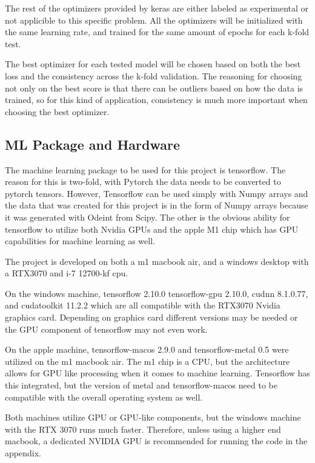 \documentclass[12pt]{article}
\begin{document}
	The rest of the optimizers provided by keras are either labeled as experimental or not applicible to this specific problem. All the optimizers will be initialized with the same learning rate, and trained for the same amount of epochs for each k-fold test.

	The best optimizer for each tested model will be chosen based on both the best loss and the consistency across the k-fold validation. The reasoning for choosing not only on the best score is that there can be outliers based on how the data is trained, so for this kind of application, consistency is much more important when choosing the best optimizer.

	\subsection*{ML Package and Hardware}

	The machine learning package to be used for this project is tensorflow. The reason for this is two-fold, with Pytorch the data needs to be converted to pytorch tensors. However, Tensorflow can be used simply with Numpy arrays and the data that was created for this project is in the form of Numpy arrays because it was generated with Odeint from Scipy. The other is the obvious ability for tensorflow to utilize both Nvidia GPUs and the apple M1 chip which has GPU capabilities for machine learning as well.

	The project is developed on both a m1 macbook air, and a windows desktop with a RTX3070 and i-7 12700-kf cpu.

	On the windows machine, tensorflow 2.10.0 tensorflow-gpu 2.10.0, cudnn 8.1.0.77, and cudatoolkit 11.2.2 which are all compatible with the RTX3070 Nvidia graphics card. Depending on graphics card different versions may be needed or the GPU component of tensorflow may not even work.

	On the apple machine, tensorflow-macos 2.9.0 and tensorflow-metal 0.5 were utilized on the m1 macbook air. The m1 chip is a CPU, but the architecture allows for GPU like processing when it comes to machine learning. Tensorflow has this integrated, but the version of metal and tensorflow-macos need to be compatible with the overall operating system as well.

	Both machines utilize GPU or GPU-like components, but the windows machine with the RTX 3070 runs much faster. Therefore, unless using a higher end macbook, a dedicated NVIDIA GPU is recommended for running the code in the appendix.
\end{document}
